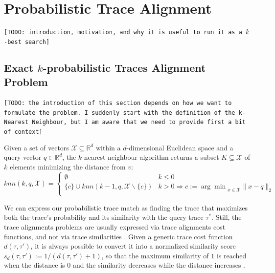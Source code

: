 \section{Probabilistic Trace Alignment}
\texttt{\color{red}[TODO: introduction, motivation, and why it is useful to run it as a $k$-best search]}

\subsection{Exact $k$-probabilistic Traces Alignment Problem}\label{subsec:exbkptap}
\texttt{\color{red}[TODO: the introduction of this section depends on how we want to formulate the problem. I suddenly start with the definition of the k-Nearest Neighbour, but I am aware that we need to provide first a bit of context]}

\begin{definition}
Given a set of vectors  $\mathcal{X}\subseteq \mathbb{R}^d$ within a $d$-dimensional Euclidean space and a query vector $q\in\mathbb{R}^d$, the $k$-nearest neighbour algorithm returns a subset $K\subseteq\mathcal{X}$ of $k$ elements minimizing the distance from $v$:
$$knn(k,q,\mathcal{X})=\begin{cases}
	\emptyset& k \leq 0\\
	\{c\}\cup knn(k-1,q,\mathcal{X}\backslash\{c\}) & k> 0 \Rightarrow c:={\arg\min}_{x\in\mathcal{X}}\|x-q\|_2\\
\end{cases}$$
\end{definition}

We can express our probabilistic trace match as finding the trace that maximizes both the trace's probability and its similarity with the query trace $\tau^*$. Still, the trace alignments problems are usually expressed via trace alignments cost functions, and not via trace similarities \cite{LeoniM17}. Given a generic trace cost function $d(\tau,\tau')$, it is always possible to convert it into a normalized similarity score $s_d(\tau,\tau'):=1/(d(\tau,\tau')+1)$, so that the maximum similarity of $1$ is reached when the distance is $0$ and the similarity decreases while the distance increases \cite{BergamiBM20}.


